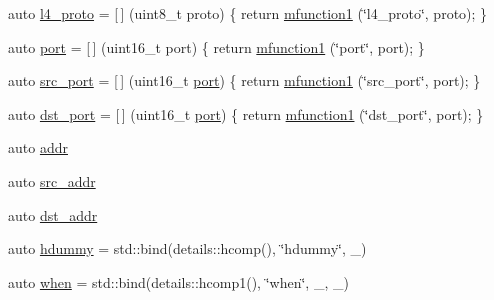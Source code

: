 \begin{DoxyCompactItemize}
\item 
auto \hyperlink{namespacepfq_1_1lang_1_1anonymous__namespace_02default_8hpp_03_a8ad2208c91dc3cd4378e715aab5fb4b7}{l4\+\_\+proto} = \mbox{[}$\,$\mbox{]} (uint8\+\_\+t proto) \{ return \hyperlink{namespacepfq_1_1lang_a68d775c68562fbd0ab9ef213f2519499}{mfunction1} (\char`\"{}l4\+\_\+proto\char`\"{}, proto); \}
\item 
auto \hyperlink{namespacepfq_1_1lang_1_1anonymous__namespace_02default_8hpp_03_a868eca03290a037cb4e9b7075085888b}{port} = \mbox{[}$\,$\mbox{]} (uint16\+\_\+t port) \{ return \hyperlink{namespacepfq_1_1lang_a68d775c68562fbd0ab9ef213f2519499}{mfunction1} (\char`\"{}port\char`\"{}, port); \}
\item 
auto \hyperlink{namespacepfq_1_1lang_1_1anonymous__namespace_02default_8hpp_03_ad1645151270994a4f396565b70233b73}{src\+\_\+port} = \mbox{[}$\,$\mbox{]} (uint16\+\_\+t \hyperlink{namespacepfq_1_1lang_1_1anonymous__namespace_02default_8hpp_03_a868eca03290a037cb4e9b7075085888b}{port}) \{ return \hyperlink{namespacepfq_1_1lang_a68d775c68562fbd0ab9ef213f2519499}{mfunction1} (\char`\"{}src\+\_\+port\char`\"{}, port); \}
\item 
auto \hyperlink{namespacepfq_1_1lang_1_1anonymous__namespace_02default_8hpp_03_a25a3b35caf255c109a6c5b4f601b1b61}{dst\+\_\+port} = \mbox{[}$\,$\mbox{]} (uint16\+\_\+t \hyperlink{namespacepfq_1_1lang_1_1anonymous__namespace_02default_8hpp_03_a868eca03290a037cb4e9b7075085888b}{port}) \{ return \hyperlink{namespacepfq_1_1lang_a68d775c68562fbd0ab9ef213f2519499}{mfunction1} (\char`\"{}dst\+\_\+port\char`\"{}, port); \}
\item 
auto \hyperlink{namespacepfq_1_1lang_1_1anonymous__namespace_02default_8hpp_03_a13cabe468839119d8d68540e3c60718b}{addr}
\item 
auto \hyperlink{namespacepfq_1_1lang_1_1anonymous__namespace_02default_8hpp_03_a2ee09b5a65a64d60bc797b2ecd1c8a4a}{src\+\_\+addr}
\item 
auto \hyperlink{namespacepfq_1_1lang_1_1anonymous__namespace_02default_8hpp_03_a3f51de44baa33ff19a94995945636072}{dst\+\_\+addr}
\item 
auto \hyperlink{namespacepfq_1_1lang_1_1anonymous__namespace_02default_8hpp_03_a5ce9765c320b01cb2c6d9b9cba0f13ff}{hdummy} = std\+::bind(details\+::hcomp(), \char`\"{}hdummy\char`\"{}, \+\_)
\item 
auto \hyperlink{namespacepfq_1_1lang_1_1anonymous__namespace_02default_8hpp_03_a22ae8d6c01ae06cdfa698cf9198d292b}{when} = std\+::bind(details\+::hcomp1(), \char`\"{}when\char`\"{}, \+\_, \+\_)

\end{DoxyCompactItemize}
